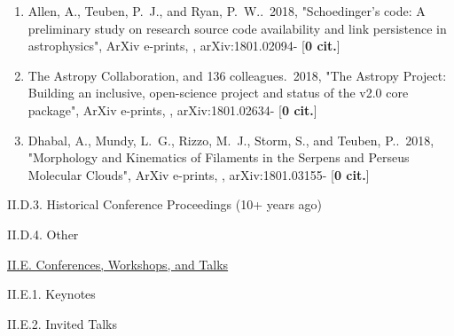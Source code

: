 \documentclass[11pt,letterpaper]{article}
\begin{document}
\begin{enumerate}[resume,label=\textbf{\arabic*}.]
\item  
Allen, A., Teuben, P.~J., and Ryan, P.~W..\  2018,  "Schoedinger's code: A 
preliminary study on research source code availability and link persistence 
in astrophysics", ArXiv e-prints,  , arXiv:1801.02094- [{\bf 0 cit.}] 

\item  
The Astropy Collaboration, and 136 colleagues.\  2018,  "The Astropy 
Project: Building an inclusive, open-science project and status of the v2.0 
core package", ArXiv e-prints,  , arXiv:1801.02634- [{\bf 0 cit.}] 

\item  
Dhabal, A., Mundy, L.~G., Rizzo, M.~J., Storm, S., and Teuben, P..\  2018,  
"Morphology and Kinematics of Filaments in the Serpens and Perseus 
Molecular Clouds", ArXiv e-prints,  , arXiv:1801.03155- [{\bf 0 cit.}] 


  

\end{enumerate}



II.D.3. Historical Conference Proceedings (10+ years ago)

II.D.4. Other





\underline{II.E. Conferences, Workshops, and Talks}

II.E.1. Keynotes

II.E.2. Invited Talks
\end{document}

